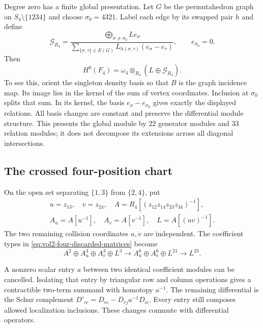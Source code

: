 Degree zero has a finite global presentation. Let $G$ be the
permutahedron graph on $S_4\setminus\{1234\}$ and choose
$\sigma_0=4321$. Label each edge by its swapped pair $h$ and
define
\[
 \mathcal G_{R_4}=
 \frac{\displaystyle\bigoplus_{\sigma\ne\sigma_0}L e_\sigma}
      {\displaystyle\sum_{\{\sigma,\tau\}\in E(G)}
            L_{h(\sigma,\tau)}(e_\sigma-e_\tau)},
 \qquad e_{\sigma_0}=0.
\]
Then
\begin{equation}\label{eq:vol2-four-H0}
 H^0(F_4)=\omega_4\otimes_{R_4}(L\oplus\mathcal G_{R_4}).
\end{equation}
To see this, orient the singleton density basis so that $B$
is the graph incidence map. Its image lies in the kernel of
the sum of vertex coordinates. Inclusion at $\sigma_0$ splits
that sum. In its kernel, the basis
$e_\sigma-e_{\sigma_0}$ gives exactly the displayed relations.
All basis changes are constant and preserve the differential
module structure. This presents the global module by $22$
generator modules and $33$ relation modules; it does not
decompose its extensions across all diagonal intersections.

\subsection{The crossed four-position chart}

On the open set separating $\{1,3\}$ from $\{2,4\}$, put
\[
 \begin{gathered}
 u=z_{13},\quad v=z_{24},\quad
 A=R_4[(z_{12}z_{14}z_{23}z_{34})^{-1}],\\
 A_u=A[u^{-1}],\quad A_v=A[v^{-1}],\quad L=A[(uv)^{-1}].
 \end{gathered}
\]
The two remaining collision coordinates $u,v$ are independent.
The coefficient types in \eqref{eq:vol2-four-discarded-matrices}
become
\[
 A^2\oplus A_u^3\oplus A_v^3\oplus L^3
 \longrightarrow A_u^6\oplus A_v^6\oplus L^{21}
 \longrightarrow L^{23}.
\]

A nonzero scalar entry $a$ between two identical coefficient
modules can be cancelled. Isolating that entry by triangular
row and column operations gives a contractible two-term
summand with homotopy $a^{-1}$. The remaining differential is
the Schur complement
$D'_{rc}=D_{rc}-D_{rj}a^{-1}D_{ic}$.
Every entry still composes allowed localization inclusions.
These changes commute with differential operators.

